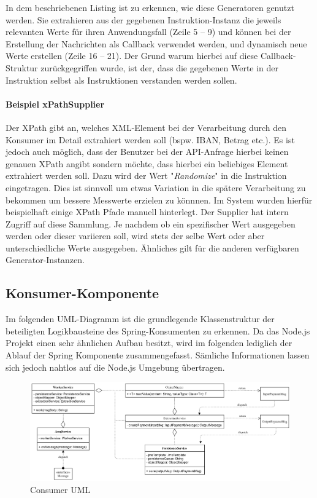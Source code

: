 In dem beschriebenen Listing ist zu erkennen, wie diese Generatoren genutzt werden. Sie extrahieren aus der gegebenen Instruktion-Instanz die jeweils relevanten Werte für ihren Anwendungsfall (Zeile 5 -- 9) und können bei der Erstellung der Nachrichten als Callback verwendet werden, und dynamisch neue Werte erstellen (Zeile 16 -- 21). Der Grund warum hierbei auf diese Callback-Struktur zurückgegriffen wurde, ist der, dass die gegebenen Werte in der Instruktion selbst als Instruktionen verstanden werden sollen. 

\paragraph{Beispiel xPathSupplier} 
Der XPath gibt an, welches XML-Element bei der Verarbeitung durch den Konsumer im Detail extrahiert werden soll (bspw. IBAN, Betrag etc.). Es ist jedoch auch möglich, dass der Benutzer bei der API-Anfrage hierbei keinen genauen XPath angibt sondern möchte, dass hierbei ein beliebiges Element extrahiert werden soll. Dazu wird der Wert "\emph{Randomize}" in die Instruktion eingetragen. Dies ist sinnvoll um etwas Variation in die spätere Verarbeitung zu bekommen um bessere Messwerte erzielen zu könnnen. Im System wurden hierfür beispielhaft einige XPath Pfade manuell hinterlegt. Der Supplier hat intern Zugriff auf diese Sammlung. Je nachdem ob ein spezifischer Wert ausgegeben werden oder dieser variieren soll, wird stets der selbe Wert oder aber unterschiedliche Werte ausgegeben. Ähnliches gilt für die anderen verfügbaren Generator-Instanzen.


\subsection{Konsumer-Komponente}

Im folgenden UML-Diagramm ist die grundlegende Klassenstruktur der beteiligten Logikbausteine des Spring-Konsumenten zu erkennen. Da das Node.js Projekt einen sehr ähnlichen Aufbau besitzt, wird im folgenden lediglich der Ablauf der Spring Komponente zusammengefasst. Sämliche Informationen lassen sich jedoch nahtlos auf die Node.js Umgebung übertragen. 

\begin{figure}[ht!]
	\centering
	\includegraphics[width=\linewidth]{kapitel/problemloesung/implementierung/_img/consumer-uml}
	\caption[Consumer UML]{Consumer UML}
	\label{fig:consumerUml}
\end{figure}

